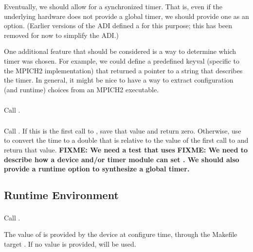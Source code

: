 \documentclass{article}
\def\fixme#1{\marginpar{FIXME:}\textbf{FIXME: #1}}
\begin{document}
Eventually, we should allow for a synchronized timer.  That is, even
if the underlying hardware does not provide a global timer, we should
provide one as an option.  (Earlier versions of the ADI defined a
 for this purpose; this has been removed for now
to simplify the ADI.)

One additional feature that should be considered is a way to determine
which timer was chosen.  For example, we could define a predefined
keyval (specific to the MPICH2 implementation) that returned a pointer
to a string that describes the timer.  In general, it might be nice to
have a way to extract configuration (and runtime) choices from an
MPICH2 executable.


\subsubsection{}
Call .

\subsubsection{}
Call .  If this is the first call to
, save that value and return zero.  Otherwise, use
 to convert the time to a double that is
relative to the value of the first call to  and
return that value.
\fixme{We need a test that uses }
\fixme{We need to describe how a device and/or timer module can set
  \code{MPI_WTIME_IS_GLOBAL}.  We should also provide a runtime option
  to synthesize a global timer.}  


\subsection{Runtime Environment}
\label{sec:runtime-env}
\subsubsection{}
Call .  

The value of  is provided by the
device at configure time, through the Makefile target
.  If no value is provided,  will be used.
\end{document}
